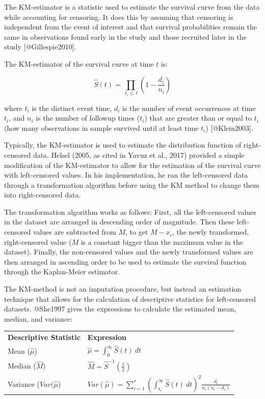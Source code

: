 \documentclass[
]{article}
\begin{document}
The KM-estimator is a statistic used to estimate the survival curve from
the data while accounting for censoring. It does this by assuming that
censoring is independent from the event of interest and that survival
probabilities remain the same in observations found early in the study
and those recruited later in the study {[}@Gillespie2010{]}.

The KM-estimator of the survival curve at time \(t\) is:

\[\hat{S}(t) = \prod_{\ t_i \le \ t }\left(1-\frac{d_i}{n_i}\right)\]

where \(t_i\) is the distinct event time, \(d_i\) is the number of event
occurrences at time \(t_i\), and \(n_i\) is the number of followup times
(\(t_i\)) that are greater than or equal to \(t_i\) (how many
observations in sample survived until at least time \(t_i\))
{[}@Klein2003{]}.

Typically, the KM-estimator is used to estimate the distribution
function of right-censored data. Helsel (2005, as cited in Yavuz et al.,
2017) provided a simple modification of the KM-estimator to allow for
the estimation of the survival curve with left-censored values. In his
implementation, he ran the left-censored data through a transformation
algorithm before using the KM method to change them into right-censored
data.

The transformation algorithm works as follows: First, all the
left-censored values in the dataset are arranged in descending order of
magnitude. Then these left-censored values are subtracted from \(M\), to
get \(M-x_i\), the newly transformed, right-censored value (\(M\) is a
constant bigger than the maximum value in the dataset). Finally, the
non-censored values and the newly transformed values are then arranged
in ascending order to be used to estimate the survival function through
the Kaplan-Meier estimator.

The KM-method is not an imputation procedure, but instead an estimation
technique that allows for the calculation of descriptive statistics for
left-censored datasets. @She1997 gives the expressions to calculate the
estimated mean, median, and variance:

\begin{table}[h]
\begin{tabular}{ll}
\textbf{Descriptive Statistic} & \textbf{Expression}                                                                                              \\
Mean ($\hat{\mu}$)             & $\hat{\mu} = \displaystyle \int_{0}^{\infty} \hat{S}(t) \ dt$                                                    \\
Median ($\hat{M}$)             & $\hat{M} = \displaystyle \hat{S}^{-1} \left (\frac{1}{2} \right)$                                                              \\
Variance ($Var(\hat{\mu}$)     & $Var(\hat{\mu}) = \displaystyle \sum_{i=1}^{r} \left( \int_{t_i}^{\infty}\hat{S}(t) \ dt \right)^2 \frac{d_i}{n_i(n_i - d_i)}$
\end{tabular}
\end{table}
\end{document}
